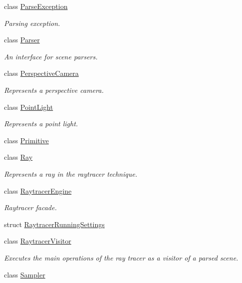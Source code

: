 \begin{DoxyCompactItemize}
class \mbox{\hyperlink{classomg_1_1_parse_exception}{Parse\+Exception}}
\begin{DoxyCompactList}\small\item\em Parsing exception. \end{DoxyCompactList}\item 
class \mbox{\hyperlink{classomg_1_1_parser}{Parser}}
\begin{DoxyCompactList}\small\item\em An interface for scene parsers. \end{DoxyCompactList}\item 
class \mbox{\hyperlink{classomg_1_1_perspective_camera}{Perspective\+Camera}}
\begin{DoxyCompactList}\small\item\em Represents a perspective camera. \end{DoxyCompactList}\item 
class \mbox{\hyperlink{classomg_1_1_point_light}{Point\+Light}}
\begin{DoxyCompactList}\small\item\em Represents a point light. \end{DoxyCompactList}\item 
class \mbox{\hyperlink{classomg_1_1_primitive}{Primitive}}
\item 
class \mbox{\hyperlink{classomg_1_1_ray}{Ray}}
\begin{DoxyCompactList}\small\item\em Represents a ray in the raytracer technique. \end{DoxyCompactList}\item 
class \mbox{\hyperlink{classomg_1_1_raytracer_engine}{Raytracer\+Engine}}
\begin{DoxyCompactList}\small\item\em Raytracer facade. \end{DoxyCompactList}\item 
struct \mbox{\hyperlink{structomg_1_1_raytracer_running_settings}{Raytracer\+Running\+Settings}}
\item 
class \mbox{\hyperlink{classomg_1_1_raytracer_visitor}{Raytracer\+Visitor}}
\begin{DoxyCompactList}\small\item\em Executes the main operations of the ray tracer as a visitor of a parsed scene. \end{DoxyCompactList}\item 
class \mbox{\hyperlink{classomg_1_1_sampler}{Sampler}}

\end{DoxyCompactItemize}
